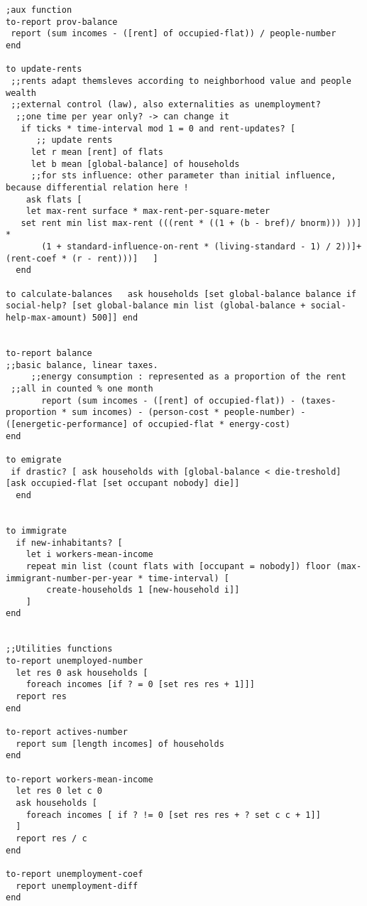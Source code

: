 \documentclass[english]{article}
\begin{document}
\begin{lstlisting}[basicstyle={\scriptsize}]
;aux function
to-report prov-balance 
 report (sum incomes - ([rent] of occupied-flat)) / people-number
end

to update-rents 
 ;;rents adapt themsleves according to neighborhood value and people wealth 
 ;;external control (law), also externalities as unemployment? 
  ;;one time per year only? -> can change it  
   if ticks * time-interval mod 1 = 0 and rent-updates? [
      ;; update rents
     let r mean [rent] of flats
     let b mean [global-balance] of households
     ;;for sts influence: other parameter than initial influence, because differential relation here !
    ask flats [
    let max-rent surface * max-rent-per-square-meter
   set rent min list max-rent (((rent * ((1 + (b - bref)/ bnorm))) ))] *
       (1 + standard-influence-on-rent * (living-standard - 1) / 2))]+ (rent-coef * (r - rent)))]   ]
  end

to calculate-balances   ask households [set global-balance balance if social-help? [set global-balance min list (global-balance + social-help-max-amount) 500]] end


to-report balance   
;;basic balance, linear taxes.
     ;;energy consumption : represented as a proportion of the rent
 ;;all in counted % one month
       report (sum incomes - ([rent] of occupied-flat)) - (taxes-proportion * sum incomes) - (person-cost * people-number) - ([energetic-performance] of occupied-flat * energy-cost)
end

to emigrate
 if drastic? [ ask households with [global-balance < die-treshold] [ask occupied-flat [set occupant nobody] die]]         
  end


to immigrate
  if new-inhabitants? [
	let i workers-mean-income
	repeat min list (count flats with [occupant = nobody]) floor (max-immigrant-number-per-year * time-interval) [
		create-households 1 [new-household i]]
	]
end


;;Utilities functions
to-report unemployed-number
  let res 0 ask households [
	foreach incomes [if ? = 0 [set res res + 1]]]
  report res
end

to-report actives-number
  report sum [length incomes] of households
end

to-report workers-mean-income
  let res 0 let c 0
  ask households [
	foreach incomes [ if ? != 0 [set res res + ? set c c + 1]]
  ]
  report res / c
end

to-report unemployment-coef
  report unemployment-diff
end


\end{lstlisting}
\end{document}
